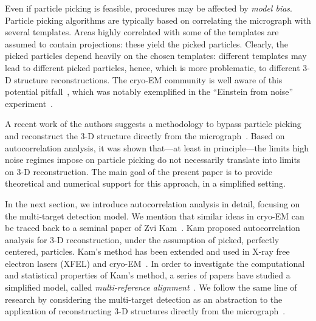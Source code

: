 \documentclass[12pt]{article}
\newcommand{\1}{\mathbf{1}}
\theoremstyle{plain}
\theoremstyle{definition}
\theoremstyle{remark}
\theoremstyle{plain}
\theoremstyle{remark}
\theoremstyle{plain}
\theoremstyle{plain}
\theoremstyle{plain}
\numberwithin{equation}{section}
\begin{document}
Even if particle picking is feasible, procedures may be affected by \emph{model bias}.
Particle picking algorithms are typically based on correlating the micrograph with several templates. Areas highly correlated with some of the templates are assumed to contain projections: these yield the picked particles. 
Clearly, the picked particles depend heavily on the chosen templates: different templates may lead to different picked particles, hence, which is more problematic, to different 3-D structure reconstructions.
The cryo-EM community is well aware of this potential pitfall~\cite{vanheel1992correlation,henderson2013avoiding,vanheel2013finding}, which was notably exemplified in the ``Einstein from noise'' experiment~\cite{shatsky2009method}. %

A recent work of the authors suggests a methodology to bypass particle picking and  reconstruct the 3-D structure directly from the micrograph~\cite{bendory2018toward}.
Based on autocorrelation analysis, it was shown that---at least in principle---the limits high noise regimes 
impose on particle picking  do not necessarily translate into limits on 3-D reconstruction.
The main goal of  the present paper is to provide theoretical and numerical support for this approach, in a simplified setting.

In the next section, we introduce autocorrelation analysis in detail, focusing on the multi-target detection model. 
We mention that similar ideas in  cryo-EM can be traced back to a seminal paper of Zvi Kam~\cite{kam1980reconstruction}. Kam proposed autocorrelation analysis for \mbox{3-D} reconstruction, under the assumption of picked, perfectly centered, particles. Kam's method has been extended and used in X-ray free electron lasers (XFEL) and cryo-EM~\cite{liu2013three,kurta2017correlations,levin20173d,von2018structure}.  
In order to investigate the computational and statistical properties of Kam's method, a series of papers have studied a simplified model, 
called   \emph{multi-reference alignment}~\cite{bandeira2014multireference,bendory2017bispectrum,bandeira2017optimal,perry2017sample,bandeira2017estimation,abbe2017multireference}.
We follow the same line of research by considering the multi-target detection as an abstraction to the application of reconstructing 3-D structures directly from the micrograph~\cite{bendory2018toward}.
\end{document}
